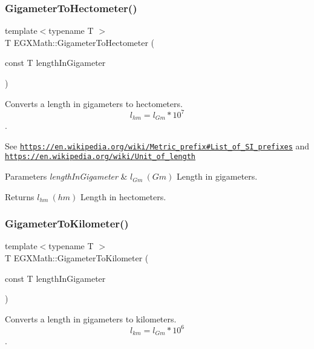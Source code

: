 \subsubsection{\texorpdfstring{Gigameter\+To\+Hectometer()}{GigameterToHectometer()}}
{\footnotesize\ttfamily template$<$typename T $>$ \\
T E\+G\+X\+Math\+::\+Gigameter\+To\+Hectometer (\begin{DoxyParamCaption}\item[{const T}]{length\+In\+Gigameter }\end{DoxyParamCaption})}



Converts a length in gigameters to hectometers. \[ l_{hm}=l_{Gm} * 10^{7} \]. 

See \href{https://en.wikipedia.org/wiki/Metric_prefix#List_of_SI_prefixes}{\tt https\+://en.\+wikipedia.\+org/wiki/\+Metric\+\_\+prefix\#\+List\+\_\+of\+\_\+\+S\+I\+\_\+prefixes} and \href{https://en.wikipedia.org/wiki/Unit_of_length}{\tt https\+://en.\+wikipedia.\+org/wiki/\+Unit\+\_\+of\+\_\+length} 
\begin{DoxyParams}{Parameters}
{\em length\+In\+Gigameter} & $ l_{Gm}\ (Gm)$ Length in gigameters. \\
\hline
\end{DoxyParams}
\begin{DoxyReturn}{Returns}
$ l_{hm}\ (hm)$ Length in hectometers. 
\end{DoxyReturn}
\mbox{\label{group___e_g_x_math-_conversions-_length_conversions-_s_i-_gigameter-_s_i_ga6f5a65da868d2c40485588dff765836e}} 
\subsubsection{\texorpdfstring{Gigameter\+To\+Kilometer()}{GigameterToKilometer()}}
{\footnotesize\ttfamily template$<$typename T $>$ \\
T E\+G\+X\+Math\+::\+Gigameter\+To\+Kilometer (\begin{DoxyParamCaption}\item[{const T}]{length\+In\+Gigameter }\end{DoxyParamCaption})}



Converts a length in gigameters to kilometers. \[ l_{km}=l_{Gm} * 10^{6} \]. 

